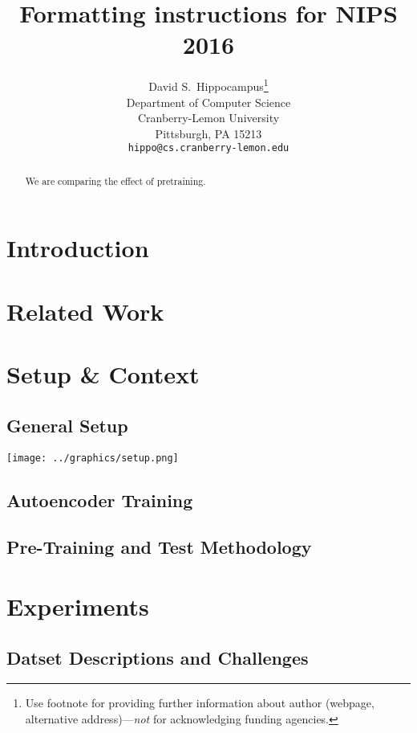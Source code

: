 \documentclass[draft]{article}
\title{Formatting instructions for NIPS 2016}
\author{
  David S.~Hippocampus\thanks{Use footnote for providing further
    information about author (webpage, alternative
    address)---\emph{not} for acknowledging funding agencies.} \\
  Department of Computer Science\\
  Cranberry-Lemon University\\
  Pittsburgh, PA 15213 \\
  \texttt{hippo@cs.cranberry-lemon.edu} \\
}
\begin{document}

\maketitle

\begin{abstract}
  We are comparing the effect of pretraining.
\end{abstract}

\section{Introduction}
\section{Related Work}
\section{Setup \& Context}
  \subsection{General Setup}
    \texttt{[image: ../graphics/setup.png]}
  \subsection{Autoencoder Training}

  \subsection{Pre-Training and Test Methodology}
  

\section{Experiments}

  \subsection{Datset Descriptions and Challenges}
\end{document}
